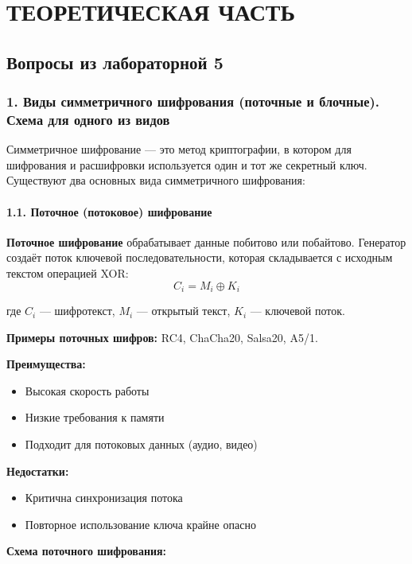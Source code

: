 \chapter*{ТЕОРЕТИЧЕСКАЯ ЧАСТЬ}

\section*{Вопросы из лабораторной 5}

\subsection*{1. Виды симметричного шифрования (поточные и блочные). Схема для одного из видов}

Симметричное шифрование — это метод криптографии, в котором для шифрования и расшифровки используется один и тот же секретный ключ. Существуют два основных вида симметричного шифрования:

\subsubsection*{1.1. Поточное (потоковое) шифрование}

\textbf{Поточное шифрование} обрабатывает данные побитово или побайтово. Генератор создаёт поток ключевой последовательности, которая складывается с исходным текстом операцией XOR:
$$C_i = M_i \oplus K_i$$

где $C_i$ — шифротекст, $M_i$ — открытый текст, $K_i$ — ключевой поток.

\textbf{Примеры поточных шифров:} RC4, ChaCha20, Salsa20, A5/1.

\textbf{Преимущества:}
\begin{itemize}
    \item Высокая скорость работы
    \item Низкие требования к памяти
    \item Подходит для потоковых данных (аудио, видео)
\end{itemize}

\textbf{Недостатки:}
\begin{itemize}
    \item Критична синхронизация потока
    \item Повторное использование ключа крайне опасно
\end{itemize}

\textbf{Схема поточного шифрования:}

